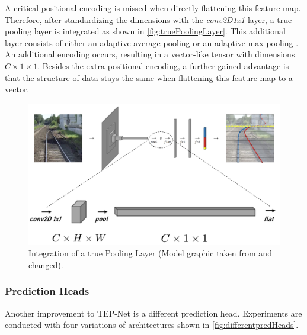 A critical positional encoding is missed when directly flattening this feature map.
Therefore, after standardizing the dimensions with the \textit{conv2D1x1} layer, a true pooling layer is integrated as shown in \autoref{fig:truePoolingLayer}.
This additional layer consists of either an adaptive average pooling \cite{pytorch_averagePool_docu} or an adaptive max pooling \cite{pytorch_maxPool_docu}.
An additional encoding occurs, resulting in a vector-like tensor with dimensions $C \times 1 \times 1$.
Besides the extra positional encoding, a further gained advantage is that the structure of data stays the same when flattening this feature map to a vector.

\begin{figure}[H]
    \centering
    \includegraphics[width=0.7\linewidth]{PICs/improvedModel/poolingLayers.jpg}
    \caption{Integration of a true Pooling Layer (Model graphic taken from \cite{tepNet2024} and changed).}
    \label{fig:truePoolingLayer}
\end{figure}

\subsubsection{Prediction Heads}
\label{subsubsec:predictionheads}

Another improvement to \ac{TEP}-Net \cite{tepNet2024} is a different prediction head.
Experiments are conducted with four variations of architectures shown in \autoref{fig:differentpredHeads}.


